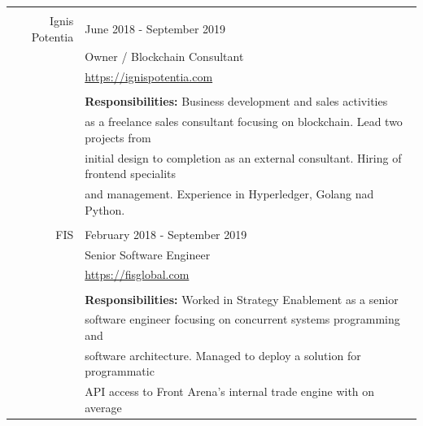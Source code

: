 \documentclass[a4paper]{article}
\begin{document}
\begin{longtable}{@{}r | l}
                   &                                                                                       \\
    Ignis Potentia & June 2018 - September 2019                                                            \\
                   & Owner / Blockchain Consultant                                                         \\
                   & \href{https://ignispotentia.com}{https://ignispotentia.com}                           \\
                   &                                                                                       \\
                   & \textbf{Responsibilities:} Business development and sales activities                  \\
                   & as a freelance sales consultant focusing on blockchain. Lead two projects from        \\
                   & initial design to completion as an external consultant. Hiring of frontend specialits \\
                   & and management. Experience in Hyperledger, Golang nad Python.                         \\
                   &                                                                                       \\
    \pagebreak
    FIS            & February 2018 - September 2019                                                        \\
                   & Senior Software Engineer                                                              \\
                   & \href{https://fisglobal.com}{https://fisglobal.com}                                   \\
                   &                                                                                       \\
                   & \textbf{Responsibilities:} Worked in Strategy Enablement as a senior                  \\
                   & software engineer focusing on concurrent systems programming and                      \\
                   & software architecture. Managed to deploy a solution for programmatic                  \\
                   & API access to Front Arena's internal trade engine with on average                     \\

\end{longtable}
\end{document}
